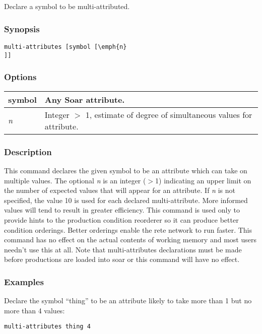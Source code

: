\subsection{}
\label{multi-attributes}
Declare a symbol to be multi-attributed. 
\subsubsection*{Synopsis}
\begin{verbatim}
multi-attributes [symbol [\emph{n}
]]
\end{verbatim}
\subsubsection*{Options}
\begin{tabular}{|l|l|}
\hline 
symbol & Any Soar attribute.  \\
 \hline 
\emph{n}
 & Integer $>$ 1, estimate of degree of simultaneous values for attribute.  \\
 \hline 
\end{tabular}
\subsubsection*{Description}
 This command declares the given symbol to be an attribute which can take on multiple values. The optional \emph{n}
 is an integer ($>$1) indicating an upper limit on the number of expected values that will appear for an attribute. If \emph{n}
 is not specified, the value 10 is used for each declared multi-attribute. More informed values will tend to result in greater efficiency. This command is used only to provide hints to the production condition reorderer so it can produce better condition orderings. Better orderings enable the rete network to run faster. This command has no effect on the actual contents of working memory and most users needn't use this at all. 
 Note that multi-attributes declarations must be made before productions are loaded into soar or this command will have no effect. 
\subsubsection*{Examples}
 Declare the symbol ``thing'' to be an attribute likely to take more than 1 but no more than 4 values: \begin{verbatim}
multi-attributes thing 4
\end{verbatim}
